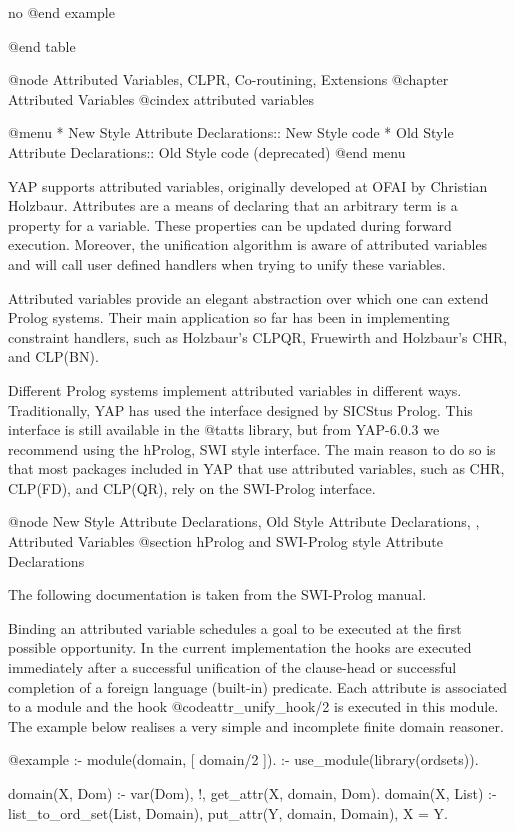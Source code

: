 {{{{{{{{{no
@end example

@end table

@node Attributed Variables, CLPR, Co-routining, Extensions
@chapter Attributed Variables
@cindex attributed variables

@menu
* New Style Attribute Declarations:: New Style code
* Old Style Attribute Declarations:: Old Style code (deprecated)
@end menu

YAP supports attributed variables, originally developed at OFAI by
Christian Holzbaur. Attributes are a means of declaring that an
arbitrary term is a property for a variable. These properties can be
updated during forward execution. Moreover, the unification algorithm is
aware of attributed variables and will call user defined handlers when
trying to unify these variables.

Attributed variables provide an elegant abstraction over which one can
extend Prolog systems. Their main application so far has been in
implementing constraint handlers, such as Holzbaur's CLPQR, Fruewirth
and Holzbaur's CHR, and CLP(BN). 

Different Prolog systems implement attributed variables in different
ways. Traditionally, YAP has used the interface designed by SICStus
Prolog. This interface is still
available in the @t{atts} library, but from YAP-6.0.3 we recommend using
the hProlog, SWI style interface. The main reason to do so is that 
most packages included in YAP that use attributed variables, such as CHR, CLP(FD), and CLP(QR),
rely on the SWI-Prolog interface.


@node New Style Attribute Declarations, Old Style Attribute Declarations, , Attributed Variables
@section hProlog and SWI-Prolog style Attribute Declarations

The following documentation is taken from the SWI-Prolog manual.

Binding an attributed variable schedules a goal to be executed at the
first possible opportunity. In the current implementation the hooks are
executed immediately after a successful unification of the clause-head
or successful completion of a foreign language (built-in) predicate. Each
attribute is associated to a module and the hook @code{attr_unify_hook/2} is
executed in this module.  The example below realises a very simple and
incomplete finite domain reasoner.

@example
:- module(domain,
	  [ domain/2			%
	  ]).
:- use_module(library(ordsets)).

domain(X, Dom) :-
	var(Dom), !,
	get_attr(X, domain, Dom).
domain(X, List) :-
	list_to_ord_set(List, Domain),
	put_attr(Y, domain, Domain),
	X = Y.

}}}}}}}}}
